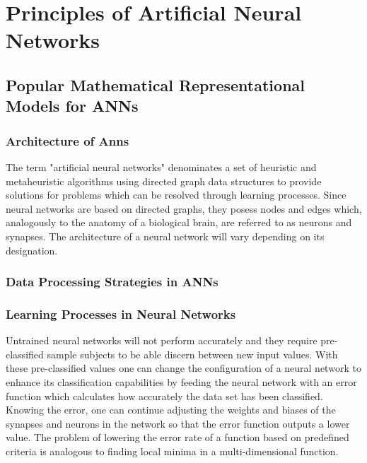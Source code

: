 \chapter{Principles of Artificial Neural Networks}
\section{Popular Mathematical Representational Models for ANNs}
\subsection{Architecture of Anns}
The term "artificial neural networks" denominates a set of heuristic and metaheuristic algorithms using directed graph data structures to provide solutions for problems which can be resolved through learning processes. Since neural networks are based on directed graphs, they posess nodes and edges which, analogously to the anatomy of a biological brain, are referred to as neurons and synapses. The architecture of a neural network will vary depending on its designation.
\subsection{Data Processing Strategies in ANNs}
\subsection{Learning Processes in Neural Networks}
Untrained neural networks will not perform accurately and they require pre-classified sample subjects to be able discern between new input values. With these pre-classified values one can change the configuration of a neural network to enhance its classification capabilities by feeding the neural network with an error function which calculates how accurately the data set has been classified. Knowing the error, one can continue adjusting the weights and biases of the synapses and neurons in the network so that the error function outputs a lower value. 
The problem of lowering the error rate of a function based on predefined criteria is analogous to finding local minima in a multi-dimensional function.
